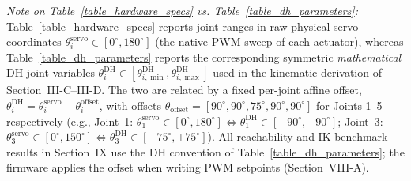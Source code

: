 \documentclass[journal]{IEEEtran}
\begin{document}
\begin{table}[!t]
\centering
\caption{Comprehensive Electromechanical Specifications of the ARIA 5-DoF Manipulator}
\label{table_hardware_specs}
\footnotesize
{}
\end{table}
\textit{Note on Table~\ref{table_hardware_specs} vs. Table~\ref{table_dh_parameters}:} Table~\ref{table_hardware_specs} reports joint ranges in raw physical servo coordinates $\theta_i^{\text{servo}} \in [0^\circ, 180^\circ]$ (the native PWM sweep of each actuator), whereas Table~\ref{table_dh_parameters} reports the corresponding symmetric \emph{mathematical} DH joint variables $\theta_i^{\text{DH}} \in [\theta_{i,\min}^{\text{DH}}, \theta_{i,\max}^{\text{DH}}]$ used in the kinematic derivation of Section~III-C--III-D. The two are related by a fixed per-joint affine offset, $\theta_i^{\text{DH}} = \theta_i^{\text{servo}} - \theta_i^{\text{offset}}$, with offsets $\theta_{\text{offset}} = [90^\circ, 90^\circ, 75^\circ, 90^\circ, 90^\circ]$ for Joints 1--5 respectively (e.g., Joint~1: $\theta_1^{\text{servo}}\in[0^\circ,180^\circ] \Leftrightarrow \theta_1^{\text{DH}}\in[-90^\circ,+90^\circ]$; Joint~3: $\theta_3^{\text{servo}}\in[0^\circ,150^\circ] \Leftrightarrow \theta_3^{\text{DH}}\in[-75^\circ,+75^\circ]$). All reachability and IK benchmark results in Section~IX use the DH convention of Table~\ref{table_dh_parameters}; the firmware applies the offset when writing PWM setpoints (Section~VIII-A).
\end{document}
